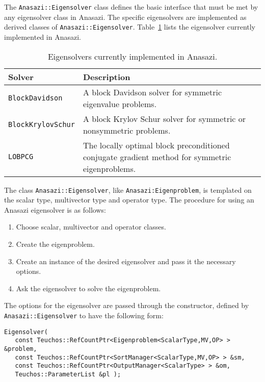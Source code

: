 The \verb!Anasazi::Eigensolver! class defines the basic interface that must be
met by any eigensolver class in Anasazi. The specific eigensolvers are
implemented as derived classes of \verb!Anasazi::Eigensolver!.
Table~\ref{tab:anasazi:solvers} lists the eigensolver currently implemented in
Anasazi.

\begin{table}[htp]
\begin{center}
\begin{tabular}{| p{4cm} p{8cm} |}
\hline
Solver & Description \\
\hline
{\tt BlockDavidson}    & A block Davidson solver for symmetric
                         eigenvalue problems.\\
{\tt BlockKrylovSchur} & A block Krylov Schur solver for symmetric or
                         nonsymmetric problems.\\
{\tt LOBPCG} & The locally optimal block preconditioned conjugate gradient
method for symmetric eigenproblems.\\
\hline
\end{tabular}
\caption{Eigensolvers currently implemented in Anasazi.}
\label{tab:anasazi:solvers}
\end{center}
\end{table}

The class \verb!Anasazi::Eigensolver!, like \verb!Anasazi:Eigenproblem!, is
templated on the scalar type, multivector type and operator
type. The procedure for using an Anasazi eigensolver is as follows:
\begin{enumerate}
\item Choose scalar, multivector and operator classes.
\item Create the eigenproblem.
\item Create an instance of the desired eigensolver and pass it the necessary
options.
\item Ask the eigensolver to solve the eigenproblem.
\end{enumerate}

The options for the eigensolver are passed through the constructor, defined by
\verb!Anasazi::Eigensolver! to have the following form:
\begin{verbatim}
Eigensolver( 
   const Teuchos::RefCountPtr<Eigenproblem<ScalarType,MV,OP> > &problem, 
   const Teuchos::RefCountPtr<SortManager<ScalarType,MV,OP> > &sm,
   const Teuchos::RefCountPtr<OutputManager<ScalarType> > &om,
   Teuchos::ParameterList &pl );
\end{verbatim}

